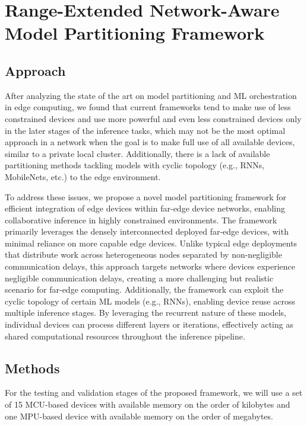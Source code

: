 \chapter{Range-Extended Network-Aware Model Partitioning Framework} \label{chap:ch4}

\section{Approach} \label{sec:se41}

After analyzing the state of the art on model partitioning and \ac{ML} 
orchestration in edge computing, we found that current frameworks tend to 
make use of less constrained devices and use more powerful and even less 
constrained devices only in the later stages of the inference tasks, which may 
not be the most optimal approach in a network when the goal is to make full use 
of all available devices, similar to a private local cluster. Additionally, there is a 
lack of available partitioning methods tackling models with cyclic topology 
(e.g., \acp{RNN}, MobileNets, etc.) to the edge environment. 

To address these issues, we propose a novel model partitioning framework for 
efficient integration of edge devices within far-edge device networks, enabling 
collaborative inference in highly constrained environments. The framework primarily 
leverages the densely interconnected deployed far-edge devices, with minimal 
reliance on more capable edge devices. Unlike typical edge deployments that 
distribute work across heterogeneous nodes separated by non-negligible 
communication delays, this approach targets networks where devices experience 
negligible communication delays, creating a more challenging but realistic 
scenario for far-edge computing.
Additionally, the framework can exploit the cyclic topology of certain \ac{ML} 
models (e.g., \acp{RNN}), enabling device reuse across multiple inference stages. 
By leveraging the recurrent nature of these models, individual devices can process 
different layers or iterations, effectively acting as shared computational resources 
throughout the inference pipeline.

\section{Methods} \label{sec:se42}

For the testing and validation stages of the proposed framework, we will use a set 
of 15 \ac{MCU}-based devices with available memory on the order of kilobytes and 
one \ac{MPU}-based device with available memory on the order of megabytes. 


